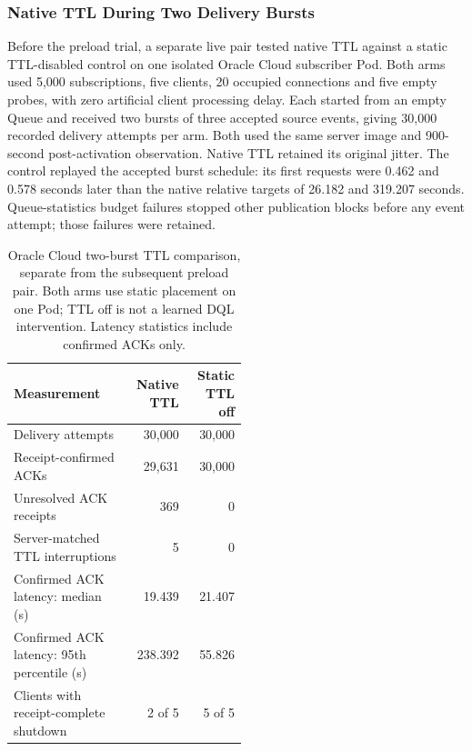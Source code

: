 \subsubsection{Native TTL During Two Delivery Bursts}
\label{sec:ttl-loaded-results}

Before the preload trial, a separate live pair tested native TTL against a
static TTL-disabled control on one isolated Oracle Cloud subscriber Pod.
Both arms used 5,000 subscriptions, five clients, 20 occupied connections and
five empty probes, with zero artificial client processing delay. Each started
from an empty Queue and received two bursts of three accepted source events,
giving 30,000 recorded delivery attempts per arm. Both used the same server
image and 900-second post-activation observation. Native TTL retained its
original jitter. The control replayed the accepted burst schedule: its first
requests were 0.462 and 0.578 seconds later than the native relative targets
of 26.182 and 319.207 seconds. Queue-statistics budget failures stopped other
publication blocks before any event attempt; those failures were retained.

\begin{table}[!htbp]
 \centering
 \small
 \renewcommand{\arraystretch}{1.14}
 \caption{Oracle Cloud two-burst TTL comparison, separate from the subsequent
 preload pair. Both arms use static placement on one Pod; TTL off is not a
 learned DQL intervention. Latency statistics include confirmed ACKs only.}
 \label{tab:ttl-loaded-results}
 \begin{tabular}{p{0.51\linewidth}rr}
  \toprule
  Measurement & Native TTL & Static TTL off \\
  \midrule
  Delivery attempts & 30,000 & 30,000 \\
  Receipt-confirmed ACKs & 29,631 & 30,000 \\
  Unresolved ACK receipts & 369 & 0 \\
  Server-matched TTL interruptions & 5 & 0 \\
  Confirmed ACK latency: median (s) & 19.439 & 21.407 \\
  Confirmed ACK latency: 95th percentile (s) & 238.392 & 55.826 \\
  Clients with receipt-complete shutdown & 2 of 5 & 5 of 5 \\
  \bottomrule
 \end{tabular}
\end{table}

